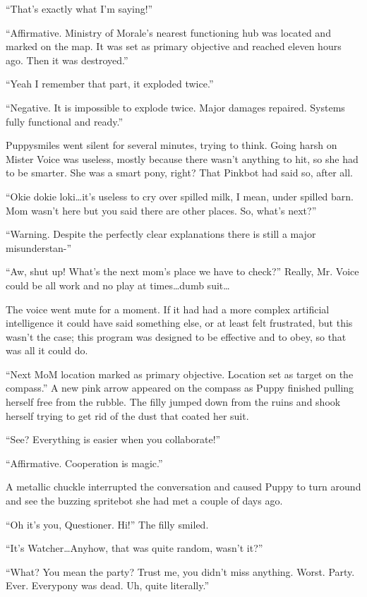 ``That's exactly what I'm saying!''

``{\mt Affirmative. Ministry of Morale's nearest functioning hub was located and marked on the map. It was set as primary objective and reached eleven hours ago. Then it was destroyed.}''

``Yeah I remember that part, it exploded twice.''

``{\mt Negative. It is impossible to explode twice. Major damages repaired. Systems fully functional and ready.}''

Puppysmiles went silent for several minutes, trying to think. Going harsh on Mister Voice was useless, mostly because there wasn't anything to hit, so she had to be smarter. She was a smart pony, right? That Pinkbot had said so, after all.

``Okie dokie loki\dots it's useless to cry over spilled milk, I mean, under spilled barn. Mom wasn't here but you said there are other places. So, what's next?''

``{\mt Warning. Despite the perfectly clear explanations there is still a major misunderstan-}''

``Aw, shut up! What's the next mom's place we have to check?'' Really, Mr. Voice could be all work and no play at times\dots dumb suit\dots

The voice went mute for a moment. If it had had a more complex artificial intelligence it could have said something else, or at least felt frustrated, but this wasn't the case; this program was designed to be effective and to obey, so that was all it could do.

``{\mt Next MoM location marked as primary objective. Location set as target on the compass.}'' A new pink arrow appeared on the compass as Puppy finished pulling herself free from the rubble. The filly jumped down from the ruins and shook herself trying to get rid of the dust that coated her suit.

``See? Everything is easier when you collaborate!''

``{\mt Affirmative. Cooperation is magic.}''

A metallic chuckle interrupted the conversation and caused Puppy to turn around and see the buzzing spritebot she had met a couple of days ago.

``Oh it's you, Questioner. Hi!'' The filly smiled.

``It's Watcher\dots Anyhow, that was quite random, wasn't it?''

``What? You mean the party? Trust me, you didn't miss anything. Worst. Party. Ever. Everypony was dead. Uh, quite literally.''


